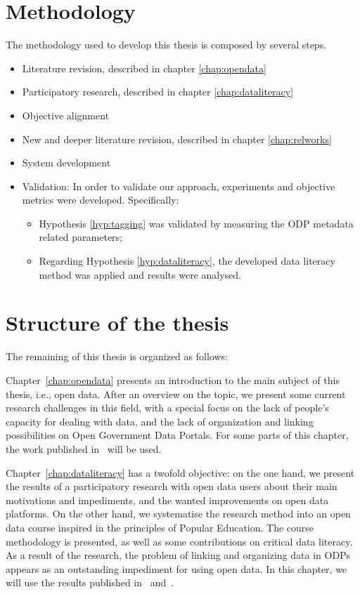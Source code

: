 \section{Methodology}
The methodology used to develop this thesis is composed by several steps.
\begin{itemize}
	\item Literature revision, described in chapter \ref{chap:opendata}
	\item Participatory research, described in chapter \ref{chap:dataliteracy}
	\item Objective alignment
	\item New and deeper literature revision, described in chapter \ref{chap:relworks}
	\item System development
	\item Validation: In order to validate our approach, experiments and objective metrics were developed. Specifically:
\begin{itemize}
	\item Hypothesis \ref{hyp:tagging} was validated by measuring the ODP metadata related parameters;
	\item Regarding Hypothesis \ref{hyp:dataliteracy}, the developed data literacy method was applied and results were analysed. 
\end{itemize}

\end{itemize}






\section{Structure of the thesis}

The remaining of this thesis is organized as follows:

Chapter~\ref{chap:opendata} presents an introduction to the main subject of this thesis, i.e., open data.
After an overview on the topic, we present some current research challenges in this field, with a special focus on the lack of people's capacity for dealing with data, and the lack of organization and linking possibilities on Open Government Data Portals. 
For some parts of this chapter, the work published in~ will be used.

Chapter~\ref{chap:dataliteracy} has a twofold objective: on the one hand, we present the results of a participatory research with open data users about their main motivations and impediments, and the wanted improvements on open data platforms. 
On the other hand, we systematise the research method into an open data course inspired in the principles of Popular Education.
The course methodology is presented, as well as some contributions on critical data literacy.
As a result of the research, the problem of linking and organizing data in ODPs appears as an outstanding impediment for using open data.
In this chapter, we will use the results published in~ and~.

